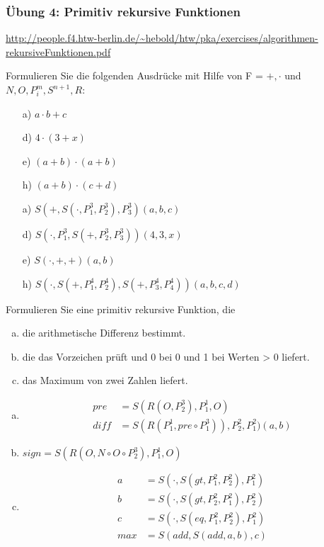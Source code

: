 \begin{card}
	\frametitle{Übung 4: Primitiv rekursive Funktionen}
	\url{http://people.f4.htw-berlin.de/~hebold/htw/pka/exercises/algorithmen-rekursiveFunktionen.pdf}
\end{card}

\begin{card}
  Formulieren Sie die folgenden Ausdrücke mit Hilfe von F = ${+, \cdot}$ und ${N, O, P^m_i, S^{n+1}, R}$:
	\begin{enumerate}[a)]
    \item[a)] $a \cdot b + c$
    \item[d)] $4 \cdot (3 + x)$
    \item[e)] $(a + b) \cdot (a + b)$
    \item[h)] $(a + b) \cdot (c + d)$
	\end{enumerate}
	\hr
	\begin{enumerate}[a)]
    \item[a)] $S(+, S(\cdot, P^3_1, P^3_2), P^3_3)(a, b, c)$
    \item[d)] $S(\cdot, P^3_1, S(+, P^3_2, P^3_3))(4, 3, x)$
    \item[e)] $S(\cdot, +, +)(a, b)$
    \item[h)] $S(\cdot, S(+, P^4_1, P^4_2), S(+, P^4_3, P^4_4))(a, b, c, d)$
	\end{enumerate}
\end{card}

\begin{card}
  Formulieren Sie eine primitiv rekursive Funktion, die
  \begin{enumerate}[a)]
    \item die arithmetische Differenz bestimmt.
    \item die das Vorzeichen prüft und 0 bei 0 und 1 bei Werten > 0 liefert.
    \item das Maximum von zwei Zahlen liefert.
	\end{enumerate}
	\hr
  \begin{enumerate}[a)]
    \item
      \begin{align*}
        pre &= S(R(O, P^3_2), P^1_1, O) \\
        diff &= S(R(P^1_1, pre \circ P^3_1)), P^2_2, P^2_1)(a, b)
      \end{align*}
    \item $sign = S(R(O, N \circ O \circ P^3_2), P^1_1, O)$
    \item
      \begin{align*}
        a &= S(\cdot, S(gt, P^2_1, P^2_2), P^2_1) \\
        b &= S(\cdot, S(gt, P^2_2, P^2_1), P^2_2) \\
        c &= S(\cdot, S(eq, P^2_1, P^2_2), P^2_1) \\
        max &= S(add, S(add, a, b), c)
      \end{align*}
	\end{enumerate}
\end{card}

